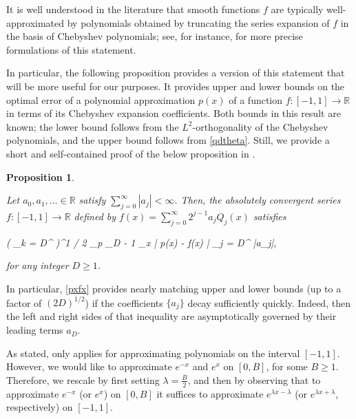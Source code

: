 \documentclass[10pt,a4paper]{article}
\theoremstyle{plain}\newtheorem{theorem}{Theorem}
\newtheorem{proposition}[theorem]{Proposition}
\theoremstyle{definition}
\begin{document}
	
	


    It is well understood in the literature that smooth functions $f$ are typically well-approximated by polynomials obtained by truncating the series expansion of $f$ in the basis of Chebyshev polynomials; see, for instance, \cite[(15.5), (15.8)]{AT} for more precise formulations of this statement. 
    
    In particular, the following proposition provides a version of this statement that will be more useful for our purposes. It provides upper and lower bounds on the optimal error of a polynomial approximation $p(x)$ of a function $f: [-1, 1] \rightarrow \mathbb{R}$ in terms of its Chebyshev expansion coefficients. Both bounds in this result are known; the lower bound follows from the $L^2$-orthogonality of the Chebyshev polynomials, and the upper bound follows from \eqref{qdtheta}. Still, we provide a short and self-contained proof of the below proposition in .

	
	\begin{proposition}
		
		\label{ajcj}
		
		Let $a_0, a_1, \ldots \in \mathbb{R}$ satisfy $\sum_{j = 0}^{\infty} |a_j| < \infty$. Then, the absolutely convergent series $f: [-1, 1] \rightarrow \mathbb{R}$ defined by $f(x) = \sum_{j = 0}^{\infty} 2^{j - 1} a_j Q_j (x)$ satisfies 
		\begin{flalign}
		\label{pxfx}
		\left( \displaystyle{} \displaystyle\sum_{k = D}^{\infty} \displaystyle{} \right)^{1 / 2} \le \displaystyle\inf_{p \in {}_{D - 1}} \displaystyle\sup_{x \in [-1, 1]} \big| p(x) - f(x) \big| \le \displaystyle\sum_{j = D}^{\infty} |a_j|,
		\end{flalign}
		
		\noindent for any integer $D \ge 1$.
		
		
	\end{proposition}
	
	In particular, \eqref{pxfx} provides nearly matching upper and lower bounds (up to a factor of $(2D)^{1/2}$) if the coefficients $\{ a_j \}$ decay sufficiently quickly. Indeed, then the left and right sides of that inequality are asymptotically governed by their leading terms $a_D$. 
	
	As stated,  only applies for approximating polynomials on the interval $[-1, 1]$. However, we would like to approximate $e^{-x}$ and $e^x$ on $[0, B]$, for some $B \ge 1$. Therefore, we rescale by first setting $\lambda = \frac{B}{2}$, and then by observing that to approximate $e^{-x}$ (or $e^x$) on $[0, B]$ it suffices to approximate $e^{\lambda x - \lambda}$ (or $e^{\lambda x + \lambda}$, respectively) on $[-1, 1]$. 
	
\end{document}
